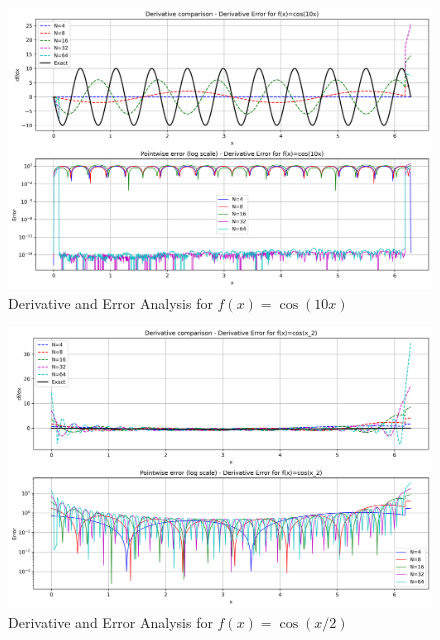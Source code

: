 \documentclass{article}
\begin{document}
\begin{figure}[h]
\centering
\includegraphics[width=1\textwidth]{figures/Derivative_Error_for_fxDerivative_Error_for_f_x__cos_10x_}
\caption{Derivative and Error Analysis for $f(x)=\cos(10x)$}
\end{figure}

\begin{figure}[h]
\centering
\includegraphics[width=1\textwidth]{figures/Derivative_Error_for_fxDerivative_Error_for_f_x__cos_x_2_}
\caption{Derivative and Error Analysis for $f(x)=\cos(x/2)$}
\end{figure}
\end{document}
